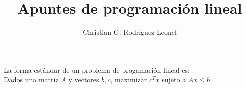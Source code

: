 \documentclass{article}
\title{Apuntes de programaci\'on lineal}
\author{Christian G. Rodr\'iguez Leonel}
\begin{document}
\maketitle

La forma estándar de un problema de progamación lineal es:\\
Dados una matriz $A$ y vectores $b,c$, maximizar $c^{T}x$ sujeto a $Ax\leq b$.
\end{document}
